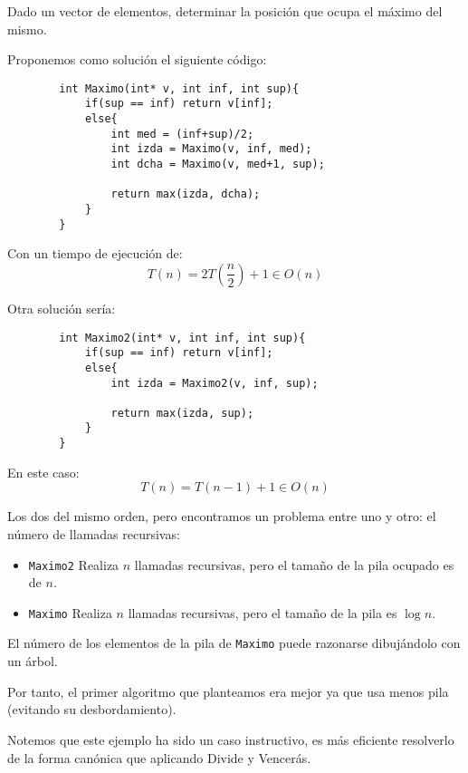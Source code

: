 \begin{ejemplo}
    Dado un vector de elementos, determinar la posición que ocupa el máximo del mismo.

    Proponemos como solución el siguiente código:

\begin{listing}[H]
    \begin{verbatim}
        int Maximo(int* v, int inf, int sup){
            if(sup == inf) return v[inf];
            else{
                int med = (inf+sup)/2;
                int izda = Maximo(v, inf, med);
                int dcha = Maximo(v, med+1, sup);

                return max(izda, dcha);
            }
        }
    \end{verbatim}
\end{listing}

Con un tiempo de ejecución de:
\begin{equation*}
    T(n) = 2T\left(\dfrac{n}{2}\right) +1 \in O(n)
\end{equation*}

Otra solución sería:
\begin{listing}[H]
    \begin{verbatim}
        int Maximo2(int* v, int inf, int sup){
            if(sup == inf) return v[inf];
            else{
                int izda = Maximo2(v, inf, sup);

                return max(izda, sup);
            }
        }
    \end{verbatim}
\end{listing}

En este caso:
\begin{equation*}
    T(n) = T(n-1)+1 \in O(n)
\end{equation*}

Los dos del mismo orden, pero encontramos un problema entre uno y otro: el número de llamadas recursivas:
\begin{itemize}
    \item \verb|Maximo2| Realiza $n$ llamadas recursivas, pero el tamaño de la pila ocupado es de $n$.
    \item \verb|Maximo| Realiza $n$ llamadas recursivas, pero el tamaño de la pila es $\log n$.
\end{itemize}
El número de los elementos de la pila de \verb|Maximo| puede razonarse dibujándolo con un árbol.

Por tanto, el primer algoritmo que planteamos era mejor ya que usa menos pila (evitando su desbordamiento).

\end{ejemplo}
\begin{observacion}
    Notemos que este ejemplo ha sido un caso instructivo, es más eficiente resolverlo de la forma canónica que aplicando Divide y Vencerás.
\end{observacion}

